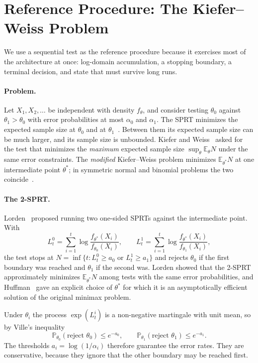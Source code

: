 \documentclass[11pt,a4paper]{article}
\theoremstyle{definition}
\theoremstyle{remark}
\newcommand{\Exp}{\mathbb{E}}
\newcommand{\Prob}{\mathbb{P}}
\begin{document}
\section{Reference Procedure: The Kiefer--Weiss Problem}
\label{sec:kw}

We use a sequential test as the reference procedure because it
exercises most of the architecture at once: log-domain accumulation, a
stopping boundary, a terminal decision, and state that must survive
long runs.

\paragraph{Problem.}
Let $X_1,X_2,\ldots$ be independent with density $f_\theta$, and
consider testing $\theta_0$ against $\theta_1>\theta_0$ with error
probabilities at most $\alpha_0$ and $\alpha_1$. The SPRT minimizes the
expected sample size at $\theta_0$ and at
$\theta_1$~\cite{waldwolfowitz1948}. Between them its expected sample
size can be much larger, and its sample size is unbounded. Kiefer and
Weiss~\cite{kiefer1957} asked for the test that minimizes the
\emph{maximum} expected sample size $\sup_\theta \Exp_\theta N$ under the
same error constraints. The \emph{modified} Kiefer--Weiss problem
minimizes $\Exp_{\theta^*}N$ at one intermediate point $\theta^*$; in
symmetric normal and binomial problems the two
coincide~\cite{weiss1962}.

\paragraph{The 2-SPRT.}
Lorden~\cite{lorden1976} proposed running two one-sided SPRTs against
the intermediate point. With
\begin{equation}
L^{0}_t=\sum_{i=1}^{t}\log\frac{f_{\theta^*}(X_i)}{f_{\theta_0}(X_i)},
\qquad
L^{1}_t=\sum_{i=1}^{t}\log\frac{f_{\theta^*}(X_i)}{f_{\theta_1}(X_i)},
\label{eq:two-sprt}
\end{equation}
the test stops at $N=\inf\{t: L^0_t\ge a_0 \text{ or } L^1_t\ge a_1\}$
and rejects $\theta_0$ if the first boundary was reached and $\theta_1$
if the second was. Lorden showed that the 2-SPRT approximately minimizes
$\Exp_{\theta^*}N$ among tests with the same error probabilities, and
Huffman~\cite{huffman1983} gave an explicit choice of $\theta^*$ for
which it is an asymptotically efficient solution of the original minimax
problem.

Under $\theta_i$ the process $\exp(L^i_t)$ is a non-negative martingale
with unit mean, so by Ville's inequality~\cite{ville1939}
\begin{equation}
\Prob_{\theta_0}(\text{reject }\theta_0)\le e^{-a_0},
\qquad
\Prob_{\theta_1}(\text{reject }\theta_1)\le e^{-a_1}.
\label{eq:ville}
\end{equation}
The thresholds $a_i=\log(1/\alpha_i)$ therefore guarantee the error
rates. They are conservative, because they ignore that the other
boundary may be reached first.
\end{document}
